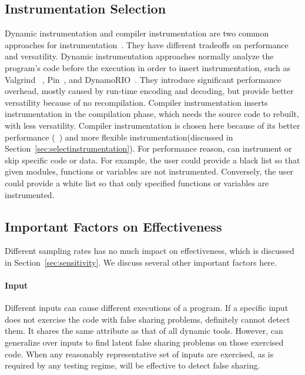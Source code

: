 \label{sec:discussion}

\subsection{Instrumentation Selection}
\label{sec:instrumentationtradeoff}
Dynamic instrumentation and compiler instrumentation are two common approaches for instrumentation~\cite{Instrumentation}. They have different tradeoffs on performance and versatility. Dynamic instrumentation approaches normally analyze the program's code before the execution in order to insert instrumentation, such as Valgrind ~\cite{Valgrind}, Pin~\cite{Pin}, and DynamoRIO~\cite{DynamoRIO}. They introduce significant performance overhead, mostly caused by run-time encoding and decoding, but provide better versatility because of no recompilation. Compiler instrumentation inserts instrumentation in the compilation phase, which needs the source code to rebuilt, with less versatility. 
Compiler instrumentation is chosen here because of its better performance (~\cite{Instrumentation}) and more flexible instrumentation(discussed in Section~\ref{sec:selectinstrumentation}). For performance reason, \Predator{} can instrument or skip specific code or data. For example, the user could provide a black list so that given modules, functions or variables are not instrumented. Conversely, the user could provide a white list so that only specified functions or variables are instrumented.

\subsection{Important Factors on Effectiveness}
Different sampling rates has no much impact on effectiveness, which is discussed in Section~\ref{sec:sensitivity}. We discuss several other important factors here. 

\paragraph{Input} Different inputs can cause different executions of a program. If a specific input does not exercise the code with false sharing problems, \Predator{} definitely cannot detect them. It shares the same attribute as that of all dynamic tools. However, \Predator{} can generalize over inputs to find latent false sharing problems on those exercised code. When any reasonably representative set of inputs are exercised, as is required by any testing regime, \Predator{} will be effective to detect false sharing.

